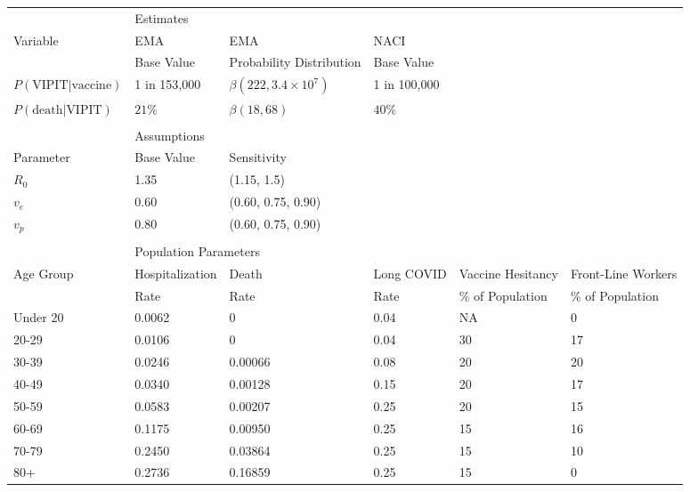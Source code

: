 \documentclass[]{interact}
\theoremstyle{plain}%
\theoremstyle{definition}
\theoremstyle{remark}
\begin{document}
\begin{table}
{\begin{tabular}{llllll} \toprule
 & \multicolumn{2}{l}{Estimates} \\ \cmidrule{2-6}
 Variable & EMA & EMA  & NACI  \\
  & Base Value & Probability Distribution & Base Value \\ \midrule
 $P(\text{VIPIT}|\text{vaccine})$ & 1 in 153,000 & $\beta(222, 3.4\times 10^7)$ & 1 in 100,000 \\
 $P(\text{death}|\text{VIPIT})$ & $21\%$ &  $\beta(18, 68)$ & $40\%$ \\ \\
 & \multicolumn{2}{l}{Assumptions} \\ \cmidrule{2-6}
 Parameter  & Base Value & Sensitivity & \\ \midrule
 $R_0$ & 1.35 & (1.15, 1.5) &  \\ 
 $v_e$ & 0.60 & (0.60, 0.75, 0.90) &  \\ 
 $v_p$ & 0.80 & (0.60, 0.75, 0.90) &  \\ \\
 
  & \multicolumn{2}{l}{Population Parameters} \\ \cmidrule{2-6}
  Age  Group & Hospitalization & Death   & Long COVID & Vaccine Hesitancy & Front-Line Workers \\ 
             & Rate            & Rate    & Rate       & \% of Population & \% of Population \\ 

  \midrule
Under 20   & 0.0062    & 0       & 0.04       & NA                & 0           \\ 
20-29      & 0.0106    & 0       & 0.04       & 30               & 17          \\ 
30-39      & 0.0246    & 0.00066 & 0.08       & 20               & 20          \\ 
40-49      & 0.0340    & 0.00128 & 0.15       & 20               & 17          \\ 
50-59      & 0.0583    & 0.00207 & 0.25       & 20               & 15          \\ 
60-69      & 0.1175    & 0.00950 & 0.25       & 15              & 16          \\ 
70-79      & 0.2450    & 0.03864 & 0.25       & 15              & 10          \\ 
80+        & 0.2736    & 0.16859 & 0.25       & 15              & 0           \\
 

\end{tabular}}
\end{table}
\end{document}
